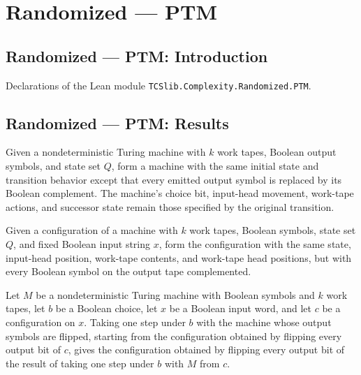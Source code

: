 \section{Randomized --- PTM}
\subsection*{Randomized --- PTM: Introduction}

Declarations of the Lean module \texttt{TCSlib.Complexity.Randomized.PTM}.

\subsection*{Randomized --- PTM: Results}

\begin{definition}
\label{Turing.NDTM.flipOutput}
\leanok
{}
Given a nondeterministic Turing machine with $k$ work tapes, Boolean output symbols, and
state set $Q$, form a machine with the same initial state and transition behavior except
that every emitted output symbol is replaced by its Boolean complement. The machine's
choice bit, input-head movement, work-tape actions, and successor state remain those
specified by the original transition.
\end{definition}

\begin{definition}
\label{Turing.NDTM.flipCfg}
\leanok
{}
Given a configuration of a machine with $k$ work tapes, Boolean symbols, state set $Q$,
and fixed Boolean input string $x$, form the configuration with the same state,
input-head position, work-tape contents, and work-tape head positions, but with every
Boolean symbol on the output tape complemented.
\end{definition}

\begin{theorem}
\label{Turing.NDTM.flipOutput_stepWith}
\leanok
{}
Let $M$ be a nondeterministic Turing machine with Boolean symbols and $k$ work tapes,
let $b$ be a Boolean choice, let $x$ be a Boolean input word, and let $c$ be a
configuration on $x$. Taking one step under $b$ with the machine whose output symbols
are flipped, starting from the configuration obtained by flipping every output bit of
$c$, gives the configuration obtained by flipping every output bit of the result of
taking one step under $b$ with $M$ from $c$.
\end{theorem}

